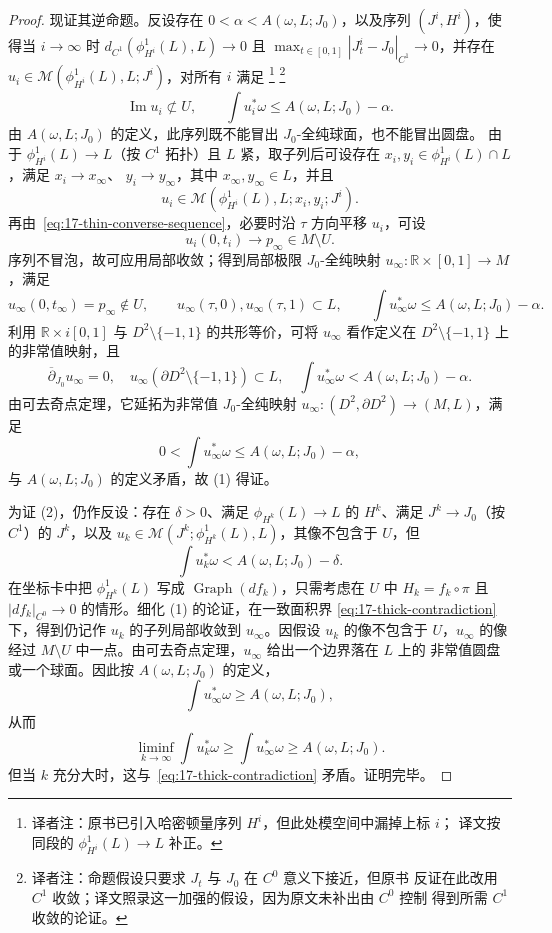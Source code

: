 \begin{proof}
现证其逆命题。反设存在 $0<\alpha<A(\omega,L;J_0)$，以及序列
$(J^i,H^i)$，使得当 $i\to\infty$ 时
$d_{C^1}(\phi_{H^i}^1(L),L)\to0$ 且
$\max_{t\in[0,1]}|J_t^i-J_0|_{C^1}\to0$，并存在
$u_i\in\mathcal M(\phi_{H^i}^1(L),L;J^i)$，对所有 $i$ 满足
\footnote{译者注：原书已引入哈密顿量序列 $H^i$，但此处模空间中漏掉上标 $i$；
译文按同段的 $\phi_{H^i}^1(L)\to L$ 补正。}
\footnote{译者注：命题假设只要求 $J_t$ 与 $J_0$ 在 $C^0$ 意义下接近，但原书
反证在此改用 $C^1$ 收敛；译文照录这一加强的假设，因为原文未补出由 $C^0$ 控制
得到所需 $C^1$ 收敛的论证。}
\begin{equation}
 \operatorname{Im}u_i\not\subset U,
 \qquad \int u_i^*\omega\leq A(\omega,L;J_0)-\alpha.
\label{eq:17-thin-converse-sequence}
\end{equation}
由 $A(\omega,L;J_0)$ 的定义，此序列既不能冒出 $J_0$-全纯球面，也不能冒出圆盘。
由于 $\phi_{H^i}^1(L)\to L$（按 $C^1$ 拓扑）且 $L$ 紧，取子列后可设存在
$x_i,y_i\in\phi_{H^i}^1(L)\cap L$，满足 $x_i\to x_\infty$、
$y_i\to y_\infty$，其中 $x_\infty,y_\infty\in L$，并且
\[
 u_i\in\mathcal M(\phi_{H^i}^1(L),L;x_i,y_i;J^i).
\]
再由~\eqref{eq:17-thin-converse-sequence}，必要时沿 $\tau$ 方向平移 $u_i$，可设
\[
 u_i(0,t_i)\to p_\infty\in M\setminus U.
\]
序列不冒泡，故可应用局部收敛；得到局部极限
$J_0$-全纯映射 $u_\infty:\mathbb R\times[0,1]\to M$，满足
\[
 u_\infty(0,t_\infty)=p_\infty\notin U,\qquad
 u_\infty(\tau,0),u_\infty(\tau,1)\subset L,
 \qquad \int u_\infty^*\omega\leq A(\omega,L;J_0)-\alpha.
\]
利用 $\mathbb R\times i[0,1]$ 与 $D^2\setminus\{-1,1\}$ 的共形等价，可将
$u_\infty$ 看作定义在 $D^2\setminus\{-1,1\}$ 上的非常值映射，且
\[
 \overline\partial_{J_0}u_\infty=0,\quad
 u_\infty(\partial D^2\setminus\{-1,1\})\subset L,\quad
 \int u_\infty^*\omega<A(\omega,L;J_0)-\alpha.
\]
由可去奇点定理，它延拓为非常值 $J_0$-全纯映射
$u_\infty:(D^2,\partial D^2)\to(M,L)$，满足
\[
 0<\int u_\infty^*\omega\leq A(\omega,L;J_0)-\alpha,
\]
与 $A(\omega,L;J_0)$ 的定义矛盾，故 (1) 得证。

为证 (2)，仍作反设：存在 $\delta>0$、满足
$\phi_{H^k}(L)\to L$ 的 $H^k$、满足 $J^k\to J_0$（按 $C^1$）的 $J^k$，以及
$u_k\in\mathcal M(J^k;\phi_{H^k}^1(L),L)$，其像不包含于 $U$，但
\begin{equation}
 \int u_k^*\omega<A(\omega,L;J_0)-\delta.
\label{eq:17-thick-contradiction}
\end{equation}
在\personDarboux{}坐标卡中把 $\phi_{H^k}^1(L)$ 写成
$\operatorname{Graph}(df_k)$，只需考虑在 $U$ 中
$H_k=f_k\circ\pi$ 且 $|df_k|_{C^0}\to0$ 的情形。细化 (1) 的论证，在一致面积界
\eqref{eq:17-thick-contradiction} 下，得到仍记作 $u_k$ 的子列局部收敛到
$u_\infty$。因假设 $u_k$ 的像不包含于 $U$，$u_\infty$ 的像经过
$M\setminus U$ 中一点。由可去奇点定理，$u_\infty$ 给出一个边界落在 $L$ 上的
非常值圆盘或一个球面。因此按 $A(\omega,L;J_0)$ 的定义，
\[
 \int u_\infty^*\omega\geq A(\omega,L;J_0),
\]
从而
\[
 \liminf_{k\to\infty}\int u_k^*\omega
 \geq\int u_\infty^*\omega\geq A(\omega,L;J_0).
\]
但当 $k$ 充分大时，这与~\eqref{eq:17-thick-contradiction} 矛盾。证明完毕。
\end{proof}
